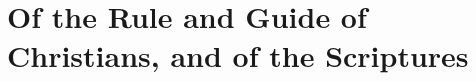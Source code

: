 \documentclass[../main.tex]{subfiles}
\begin{document}
	
	\chapter{Of the Rule and Guide of Christians, and of the Scriptures}
	
	
	
	\theendnotes
	\setcounter{endnote}{0}
\end{document}
